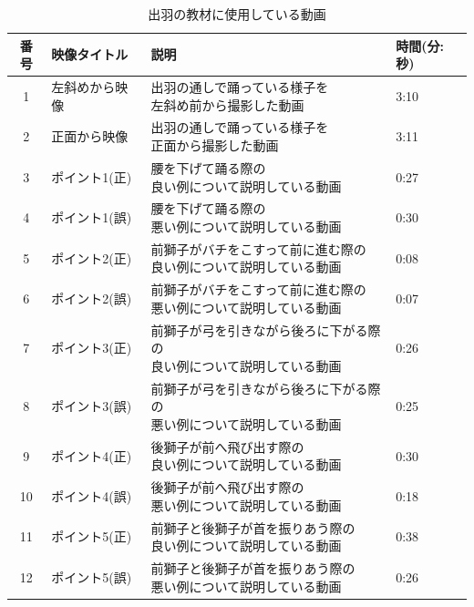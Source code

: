\documentclass[12pt]{ltjsarticle}
\begin{document}
\begin{table}[h]
  \caption{出羽の教材に使用している動画}
  \label{table:hdewa}
  \centering
  {\renewcommand\arraystretch{2.0}
   \begin{tabular}{clll}
    \hline
    番号 & 映像タイトル & 説明 & 時間(分:秒) \\
  
    \hline \hline
    1 &  左斜めから映像 &  \shortstack{出羽の通しで踊っている様子を\\左斜め前から撮影した動画} & 3:10 \\
    2 &  正面から映像 &  \shortstack{出羽の通しで踊っている様子を\\正面から撮影した動画} & 3:11 \\
    3 &  ポイント1(正) &  \shortstack{腰を下げて踊る際の\\良い例について説明している動画} & 0:27 \\
    4 &  ポイント1(誤) &  \shortstack{腰を下げて踊る際の\\悪い例について説明している動画} & 0:30 \\ 
    5 &  ポイント2(正) &  \shortstack{前獅子がバチをこすって前に進む際の\\良い例について説明している動画} & 0:08 \\ 
    6 &  ポイント2(誤) &  \shortstack{前獅子がバチをこすって前に進む際の\\悪い例について説明している動画} & 0:07 \\ 
    7 &  ポイント3(正) &  \shortstack{前獅子が弓を引きながら後ろに下がる際の\\良い例について説明している動画} & 0:26 \\ 
    8 &  ポイント3(誤) &  \shortstack{前獅子が弓を引きながら後ろに下がる際の\\悪い例について説明している動画} & 0:25 \\ 
    9 &  ポイント4(正) &  \shortstack{後獅子が前へ飛び出す際の\\良い例について説明している動画} & 0:30 \\ 
    10 &  ポイント4(誤) &  \shortstack{後獅子が前へ飛び出す際の\\悪い例について説明している動画} & 0:18 \\ 
    11 &  ポイント5(正) &  \shortstack{前獅子と後獅子が首を振りあう際の\\良い例について説明している動画} & 0:38 \\ 
    12 &  ポイント5(誤) &  \shortstack{前獅子と後獅子が首を振りあう際の\\悪い例について説明している動画} & 0:26 \\ 




  

    \hline
   \end{tabular}
  }
 \end{table}
 
\end{document}

